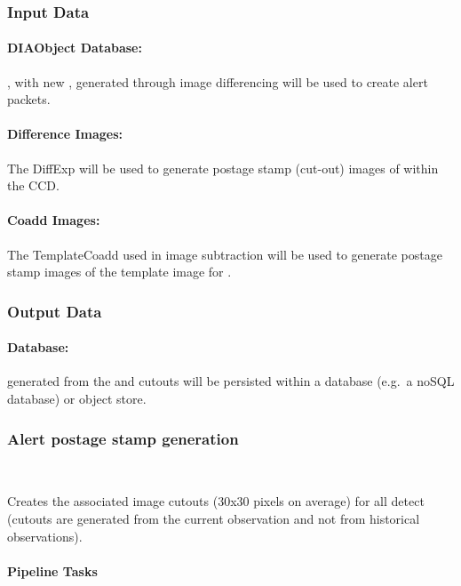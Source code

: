 \subsubsection{Input Data}
\label{sec:apADInput}

\paragraph*{DIAObject Database:} \DIAObjects, with new \DIASources, generated through image differencing will be used to create alert packets.

\paragraph*{Difference Images:} The DiffExp will be used to  generate postage stamp (cut-out) images of \DIASources within the CCD. 

\paragraph*{Coadd Images:} The TemplateCoadd used in image subtraction will be used to  generate postage stamp images of the template image for \DIAObjects.


\subsubsection{Output Data}

\paragraph*{\VOEvent Database:} \VOEvents generated from the \DIAObjects and cutouts will be persisted within a database (e.g.\ a noSQL database) or object store. 




\subsubsection{Alert postage stamp generation}~

Creates the associated image cutouts (30x30 pixels on average) for all detect \DIAObjects (cutouts are generated from the current observation and not from historical observations).

\paragraph{Pipeline Tasks}

